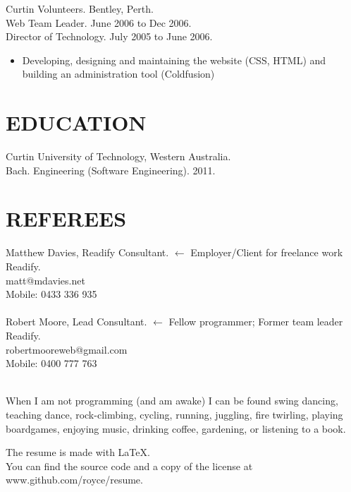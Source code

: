 \documentclass[margin]{res}
\begin{document}
\begin{resume}
  Curtin Volunteers. Bentley, Perth. \\
  Web Team Leader.  June 2006 to Dec 2006.\\
  Director of Technology.  July 2005 to June 2006.
  \begin{itemize}
    \item Developing, designing and maintaining the website (CSS, HTML) and building an administration tool (Coldfusion)
  \end{itemize} 

  \section{EDUCATION}
  Curtin University of Technology, Western Australia. \\
  Bach. Engineering (Software Engineering). 2011.

  \section{REFEREES}
  Matthew Davies, Readify Consultant.
  \hfill $\longleftarrow$ Employer/Client for freelance work\\
  Readify. \\
  matt@mdavies.net  \\
  Mobile: 0433 336 935 \\
  \\
  Robert Moore, Lead Consultant.
  \hfill $\longleftarrow$ Fellow programmer; Former team leader\\
  Readify. \\
  robertmooreweb@gmail.com \\
  Mobile: 0400 777 763 \\
  \\

\end{resume} 

\vfill
\centering

\hspace{-1.75in}  When I am not programming (and am awake) I can be found swing dancing, \\
\hspace{-1.75in}  teaching dance, rock-climbing, cycling, running, juggling, fire twirling, playing\\
\hspace{-1.75in}  boardgames, enjoying music, drinking coffee, gardening, or listening to a book.

\vfill
\hspace{-1.75in}  The resume is made with \LaTeX. \\
\hspace{-1.75in}  You can find the source code and a copy of the license
                  at www.github.com/royce/resume.
\end{document}

